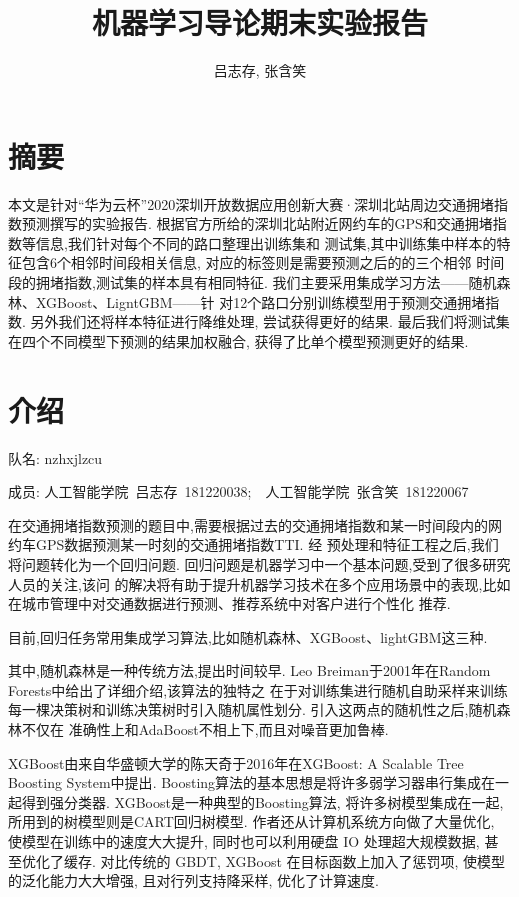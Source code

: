 \documentclass[a4paper,UTF8]{article}
\begin{document}
	\title{机器学习导论期末实验报告\\}
	\author{吕志存, 张含笑}
  \maketitle
  
\section{摘要}
本文是针对“华为云杯”2020深圳开放数据应用创新大赛·深圳北站周边交通拥堵指数预测撰写的实验报告. 
根据官方所给的深圳北站附近网约车的GPS和交通拥堵指数等信息,我们针对每个不同的路口整理出训练集和
测试集,其中训练集中样本的特征包含6个相邻时间段相关信息, 对应的标签则是需要预测之后的的三个相邻
时间段的拥堵指数,测试集的样本具有相同特征. 我们主要采用集成学习方法——随机森林、XGBoost、LigntGBM——针
对12个路口分别训练模型用于预测交通拥堵指数. 另外我们还将样本特征进行降维处理, 尝试获得更好的结果. 最后我们将测试集在四个不同模型下预测的结果加权融合, 获得了比单个模型预测更好的结果. 

\section{介绍}
队名: nzhxjlzcu

成员:
	人工智能学院\ 吕志存\ 181220038;\ \ 人工智能学院\ 张含笑\ 181220067

在交通拥堵指数预测的题目中,需要根据过去的交通拥堵指数和某一时间段内的网约车GPS数据预测某一时刻的交通拥堵指数TTI. 经
预处理和特征工程之后,我们将问题转化为一个回归问题. 回归问题是机器学习中一个基本问题,受到了很多研究人员的关注,该问
的解决将有助于提升机器学习技术在多个应用场景中的表现,比如在城市管理中对交通数据进行预测、推荐系统中对客户进行个性化
推荐. 

目前,回归任务常用集成学习算法,比如随机森林、XGBoost、lightGBM这三种.  

其中,随机森林是一种传统方法,提出时间较早. Leo Breiman于2001年在Random Forests中给出了详细介绍\cite{ref1},该算法的独特之
在于对训练集进行随机自助采样来训练每一棵决策树和训练决策树时引入随机属性划分. 引入这两点的随机性之后,随机森林不仅在
准确性上和AdaBoost不相上下,而且对噪音更加鲁棒.  

XGBoost由来自华盛顿大学的陈天奇于2016年在XGBoost: A Scalable Tree Boosting System中提出\cite{ref2}. 
Boosting算法的基本思想是将许多弱学习器串行集成在一起得到强分类器. XGBoost是一种典型的Boosting算法, 
将许多树模型集成在一起, 所用到的树模型则是CART回归树模型. 
作者还从计算机系统方向做了大量优化, 使模型在训练中的速度大大提升, 同时也可以利用硬盘 IO 处理超大规模数据, 甚至优化了缓存. 
对比传统的 GBDT, XGBoost 在目标函数上加入了惩罚项, 使模型的泛化能力大大增强, 且对行列支持降采样, 优化了计算速度. 
\end{document}
